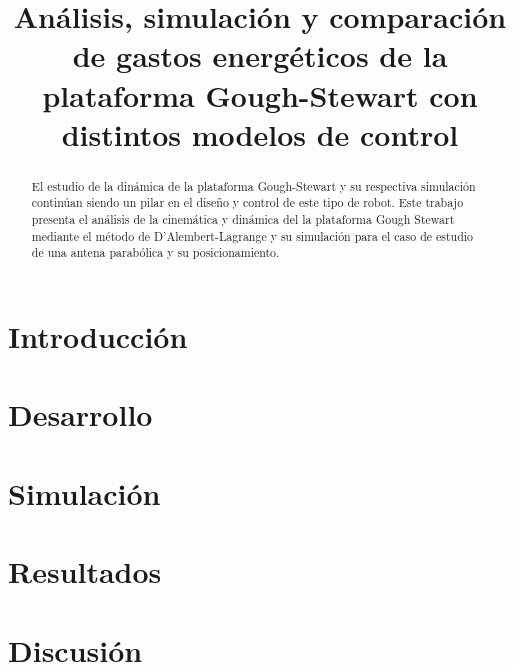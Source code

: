 \documentclass[techreport]{IEEEtran}
\begin{document}
\title{
Análisis, simulación y comparación de gastos energéticos de la plataforma Gough-Stewart con distintos modelos de control\\
}


\author{
}

\maketitle

\begin{abstract}
El estudio de la dinámica de la plataforma Gough-Stewart y su respectiva simulación continúan siendo un pilar en el diseño y control de este tipo de robot.
Este trabajo presenta el análisis de la cinemática y dinámica del la plataforma Gough Stewart mediante el método de D'Alembert-Lagrange y su simulación para el caso de estudio de una antena parabólica y su posicionamiento.


\end{abstract}


\section{Introducción}


\section{Desarrollo}


\section{Simulación}


\section{Resultados}


\section{Discusión}

\end{document}

